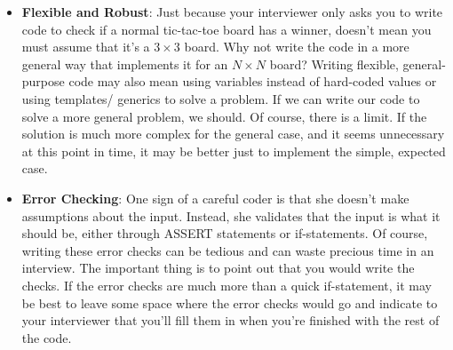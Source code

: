 \documentclass{report}
\begin{document}
\begin{itemize}
\begin{cppcode}
                int getMinindex(int[] array) { ... }
                int getMaxindex(int[] array) { ... }
                id swap(int[] array, int m, int n) { ... }
            \end{cppcode}
            \bigbreak \noindent 
            While the non-modular code isn't particularly awful, the nice thing about the modular code is that it's easily testable because each component can be verified separately. As code gets more complex, it becomes increasingly important to write it in a modular way. This will make it easier to read and maintain. Your inter viewer wants to see you demonstrate these skills in your interview.
        \item \textbf{Flexible and Robust}: Just because your interviewer only asks you to write code to check if a normal tic-tac-toe board has a winner, doesn't mean you must assume that it's a $3\times 3$ board. Why not write the code in a more general way that implements it for an $N\times N$ board?
            \bigbreak \noindent 
            Writing flexible, general-purpose code may also mean using variables instead of hard-coded values or using templates/ generics to solve a problem. If we can write our code to solve a more general problem, we should.
            \bigbreak \noindent 
            Of course, there is a limit. If the solution is much more complex for the general case, and it seems unnecessary at this point in time, it may be better just to implement the simple, expected case.
        \item \textbf{Error Checking}: One sign of a careful coder is that she doesn't make assumptions about the input. Instead, she validates that the input is what it should be, either through ASSERT statements or if-statements.
            \bigbreak \noindent 
            Of course, writing these error checks can be tedious and can waste precious time in an interview. The important thing is to point out that you would write the checks. If the error checks are much more than a quick if-statement, it may be best to leave some space where the error checks would go and indicate to your interviewer that you'll fill them in when you're finished with the rest of the code.
    \end{itemize}
\end{document}
